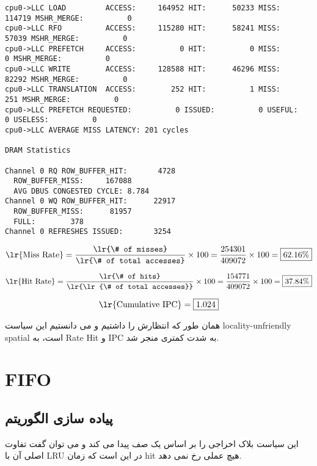 \documentclass[17pt]{article}
\begin{document}
\begin{LTR}
\begin{lstlisting}[basicstyle=\tiny\ttfamily]
cpu0->LLC LOAD         ACCESS:     164952 HIT:      50233 MISS:     114719 MSHR_MERGE:          0
cpu0->LLC RFO          ACCESS:     115280 HIT:      58241 MISS:      57039 MSHR_MERGE:          0
cpu0->LLC PREFETCH     ACCESS:          0 HIT:          0 MISS:          0 MSHR_MERGE:          0
cpu0->LLC WRITE        ACCESS:     128588 HIT:      46296 MISS:      82292 MSHR_MERGE:          0
cpu0->LLC TRANSLATION  ACCESS:        252 HIT:          1 MISS:        251 MSHR_MERGE:          0
cpu0->LLC PREFETCH REQUESTED:          0 ISSUED:          0 USEFUL:          0 USELESS:          0
cpu0->LLC AVERAGE MISS LATENCY: 201 cycles

DRAM Statistics

Channel 0 RQ ROW_BUFFER_HIT:       4728
  ROW_BUFFER_MISS:     167088
  AVG DBUS CONGESTED CYCLE: 8.784
Channel 0 WQ ROW_BUFFER_HIT:      22917
  ROW_BUFFER_MISS:      81957
  FULL:        378
Channel 0 REFRESHES ISSUED:       3254
\end{lstlisting}
\end{LTR}

\begin{center}
\[
\text{\lr{Miss Rate}} = \frac{\text{\lr{\# of misses}}}{\text{\lr{\# of total accesses}}} \times 100 = \frac{254301}{409072} \times 100 = \boxed{62.16\%}
\]

\vspace{0.2cm} %

\[
\text{\lr{Hit Rate}} = \frac{\text{\lr{\# of hits}}}{\text{\lr{\lr{\# of total accesses}}}} \times 100 = \frac{154771}{409072} \times 100 = \boxed{37.84\%}
\]

\vspace{0.2cm} %

\[
\text{\lr{Cumulative IPC}} = \boxed{1.024}
\]
\end{center}

همان طور که انتظارش را داشتیم و می دانستیم این سیاست locality-unfriendly spatial است، به Rate Hit و IPC به شدت کمتری منجر شد.

\section{FIFO}
\subsection{پیاده سازی الگوریتم}
این سیاست بلاک اخراجی را بر اساس یک صف پیدا می کند و می توان گفت تفاوت اصلی آن با LRU در این است که زمان hit هیچ عملی رخ نمی دهد.
\end{document}
